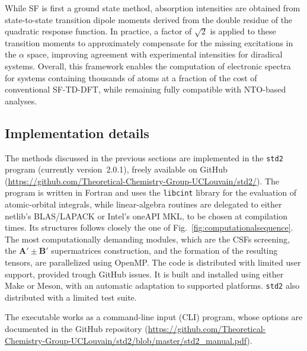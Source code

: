 \documentclass[%
 aip,
 amsmath,amssymb,
preprint,%
]{revtex4-2}
\begin{document}
While SF is first a ground state method, absorption intensities are obtained from state-to-state transition dipole moments derived from the double residue of the quadratic response function.  
In practice, a factor of $\sqrt 2$ is applied to these transition moments to approximately compensate for the missing excitations in the $\alpha$ space, improving agreement with experimental intensities for diradical systems.  
Overall, this framework enables the computation of electronic spectra for systems containing thousands of atoms at a fraction of the cost of conventional SF-TD-DFT, while remaining fully compatible with NTO-based analyses.\cite{dewergifosseAreFullyConjugated2019}



\subsection{Implementation details}

The methods discussed in the previous sections are implemented in the \texttt{std2} program (currently version~2.0.1\cite{std2zenodo}), freely available on GitHub (\url{https://github.com/Theoretical-Chemistry-Group-UCLouvain/std2/}). 
The program is written in Fortran and uses the \texttt{libcint}\cite{libcint} library for the evaluation of atomic-orbital integrals, while linear-algebra routines are delegated to either netlib's BLAS/LAPACK or Intel's oneAPI MKL, to be chosen at compilation times.
Its structures follows closely the one of Fig.~\ref{fig:computationalsequence}.
The most computationally demanding modules, which are the CSFs screening, the $\mathbf A'\pm \mathbf B'$ supermatrices construction, and the formation of the resulting tensors, are parallelized using OpenMP.
The code is distributed with limited user support, provided trough GitHub issues. 
It is built and installed using either Make or Meson, with an automatic adaptation to supported platforms. 
\texttt{std2} also distributed with a limited test suite. 

The executable works as a command-line input (CLI) program, whose options are documented in the GitHub repository (\url{https://github.com/Theoretical-Chemistry-Group-UCLouvain/std2/blob/master/std2_manual.pdf}).
\end{document}
